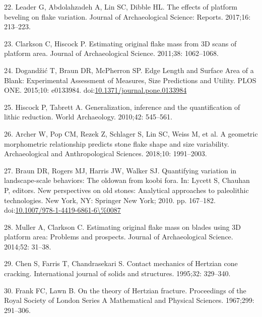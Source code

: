 \documentclass[10pt,letterpaper]{article}
\newenvironment{cslreferences}%
  {}%
  {\par}
\begin{document}
\begin{cslreferences}
\leavevmode\hypertarget{ref-leader_effects_2017}{}%
22. Leader G, Abdolahzadeh A, Lin SC, Dibble HL. The effects of platform
beveling on flake variation. Journal of Archaeological Science: Reports.
2017;16: 213--223.

\leavevmode\hypertarget{ref-clarkson_estimating_2011-1}{}%
23. Clarkson C, Hiscock P. Estimating original flake mass from 3D scans
of platform area. Journal of Archaeological Science. 2011;38:
1062--1068.

\leavevmode\hypertarget{ref-dogandzic_edge_2015}{}%
24. Dogandžić T, Braun DR, McPherron SP. Edge Length and Surface Area of
a Blank: Experimental Assessment of Measures, Size Predictions and
Utility. PLOS ONE. 2015;10: e0133984.
doi:\href{https://doi.org/10.1371/journal.pone.0133984}{10.1371/journal.pone.0133984}

\leavevmode\hypertarget{ref-hiscock_generalization_2010}{}%
25. Hiscock P, Tabrett A. Generalization, inference and the
quantification of lithic reduction. World Archaeology. 2010;42:
545--561.

\leavevmode\hypertarget{ref-archer_geometric_2018}{}%
26. Archer W, Pop CM, Rezek Z, Schlager S, Lin SC, Weiss M, et al. A
geometric morphometric relationship predicts stone flake shape and size
variability. Archaeological and Anthropological Sciences. 2018;10:
1991--2003.

\leavevmode\hypertarget{ref-Braun2010}{}%
27. Braun DR, Rogers MJ, Harris JW, Walker SJ. Quantifying variation in
landscape-scale behaviors: The oldowan from koobi fora. In: Lycett S,
Chauhan P, editors. New perspectives on old stones: Analytical
approaches to paleolithic technologies. New York, NY: Springer New York;
2010. pp. 167--182.
doi:\href{https://doi.org/10.1007/978-1-4419-6861-6/\%0087}{10.1007/978-1-4419-6861-6\textbackslash\%0087}

\leavevmode\hypertarget{ref-muller_estimating_2014}{}%
28. Muller A, Clarkson C. Estimating original flake mass on blades using
3D platform area: Problems and prospects. Journal of Archaeological
Science. 2014;52: 31--38.

\leavevmode\hypertarget{ref-chen_contact_1995}{}%
29. Chen S, Farris T, Chandrasekari S. Contact mechanics of Hertzian
cone cracking. International journal of solids and structures. 1995;32:
329--340.

\leavevmode\hypertarget{ref-frank_theory_1967}{}%
30. Frank FC, Lawn B. On the theory of Hertzian fracture. Proceedings of
the Royal Society of London Series A Mathematical and Physical Sciences.
1967;299: 291--306.


\end{cslreferences}
\end{document}
